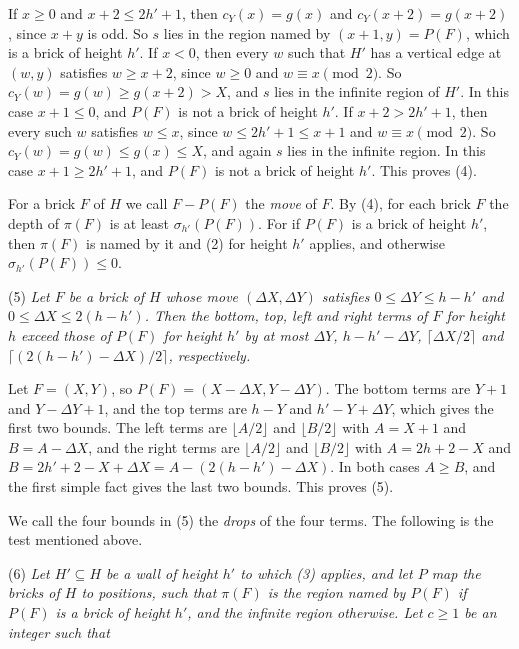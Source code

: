 {If $x \ge 0$ and $x + 2 \le 2h' + 1$, then $c_Y(x) = g(x)$ and $c_Y(x + 2) = g(x + 2)$, since $x + y$ is odd. So $s$ lies in the region named by $(x + 1, y) = P(F)$, which is a brick of height $h'$. If $x < 0$, then every $w$ such that $H'$ has a vertical edge at $(w, y)$ satisfies $w \ge x + 2$, since $w \ge 0$ and $w \equiv x \pmod 2$. So $c_Y(w) = g(w) \ge g(x + 2) > X$, and $s$ lies in the infinite region of $H'$. In this case $x + 1 \le 0$, and $P(F)$ is not a brick of height $h'$. If $x + 2 > 2h' + 1$, then every such $w$ satisfies $w \le x$, since $w \le 2h' + 1 \le x + 1$ and $w \equiv x \pmod 2$. So $c_Y(w) = g(w) \le g(x) \le X$, and again $s$ lies in the infinite region. In this case $x + 1 \ge 2h' + 1$, and $P(F)$ is not a brick of height $h'$. This proves (4).

For a brick $F$ of $H$ we call $F - P(F)$ the \textit{move} of $F$. By (4), for each brick $F$ the depth of $\pi(F)$ is at least $\sigma_{h'}(P(F))$. For if $P(F)$ is a brick of height $h'$, then $\pi(F)$ is named by it and (2) for height $h'$ applies, and otherwise $\sigma_{h'}(P(F)) \le 0$.

\hspace*{12pt}(5) \textit{Let $F$ be a brick of $H$ whose move $(\Delta X, \Delta Y)$ satisfies $0 \le \Delta Y \le h - h'$ and $0 \le \Delta X \le 2(h - h')$. Then the bottom, top, left and right terms of $F$ for height $h$ exceed those of $P(F)$ for height $h'$ by at most $\Delta Y$, $h - h' - \Delta Y$, $\lceil \Delta X/2 \rceil$ and $\lceil (2(h - h') - \Delta X)/2 \rceil$, respectively.}

Let $F = (X, Y)$, so $P(F) = (X - \Delta X, Y - \Delta Y)$. The bottom terms are $Y + 1$ and $Y - \Delta Y + 1$, and the top terms are $h - Y$ and $h' - Y + \Delta Y$, which gives the first two bounds. The left terms are $\lfloor A/2 \rfloor$ and $\lfloor B/2 \rfloor$ with $A = X + 1$ and $B = A - \Delta X$, and the right terms are $\lfloor A/2 \rfloor$ and $\lfloor B/2 \rfloor$ with $A = 2h + 2 - X$ and $B = 2h' + 2 - X + \Delta X = A - (2(h - h') - \Delta X)$. In both cases $A \ge B$, and the first simple fact gives the last two bounds. This proves (5).

We call the four bounds in (5) the \textit{drops} of the four terms. The following is the test mentioned above.

\hspace*{12pt}(6) \textit{Let $H' \subseteq H$ be a wall of height $h'$ to which (3) applies, and let $P$ map the bricks of $H$ to positions, such that $\pi(F)$ is the region named by $P(F)$ if $P(F)$ is a brick of height $h'$, and the infinite region otherwise. Let $c \ge 1$ be an integer such that}

}
